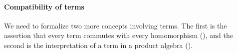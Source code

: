 \ifshort\else
\paragraph*{Compatibility of terms}
\fi
We need to formalize two more concepts involving terms.
The first is the assertion that every term commutes with every homomorphism (), and
the second is the interpretation of a term in a product algebra ().
\begin{code}%
\>[0]\<%
\\
\>[0]\AgdaSpace{}%
\AgdaModule{\AgdaUnderscore{}}\AgdaSpace{}%
\AgdaSymbol{\{}\AgdaSpace{}%
\AgdaSymbol{:}\AgdaSpace{}%
\AgdaSpace{}%
\AgdaSymbol{\}\{}\AgdaSpace{}%
\AgdaSymbol{:}\AgdaSpace{}%
\AgdaSpace{}%
\AgdaSpace{}%
\AgdaSymbol{\}\{}\AgdaSpace{}%
\AgdaSymbol{:}\AgdaSpace{}%
\AgdaSpace{}%
\AgdaSpace{}%
\AgdaSymbol{\}(}\AgdaSpace{}%
\AgdaSymbol{:}\AgdaSpace{}%
\AgdaSpace{}%
\AgdaSpace{}%
\AgdaSymbol{)}\AgdaSpace{}%
\<%
\\
\>[0][@{}l@{\AgdaIndent{0}}]%
\>[1]\AgdaSpace{}%
\AgdaSpace{}%
%
\>[46]\AgdaSpace{}%
\AgdaSymbol{(}\AgdaSpace{}%
%
\>[66]\AgdaSymbol{)}\<%
\\
%
\>[1]\AgdaSpace{}%
\AgdaSpace{}%
\AgdaSpace{}%
\AgdaSpace{}%
\AgdaSymbol{(}\AgdaSpace{}%
\AgdaSpace{}%
\AgdaSpace{}%
\AgdaSpace{}%
\AgdaSymbol{)}%
\>[46]\AgdaSpace{}%
\AgdaSymbol{(}%
\>[66]\AgdaSymbol{)}\<%
\\
%
\>[1]\AgdaSpace{}%
\AgdaSpace{}%
\AgdaOperator{\AgdaFunction{𝔻[}}\AgdaSpace{}%
\AgdaSpace{}%
\AgdaOperator{\AgdaFunction{]}}%
\>[46]\AgdaSpace{}%
\AgdaSymbol{(}\AgdaSpace{}%
\AgdaSpace{}%
\AgdaSymbol{;}\AgdaSpace{}%
%
\>[66]\AgdaSymbol{)}\<%
\\
%
\>[1]\AgdaSpace{}%
\AgdaSpace{}%

\end{code}
